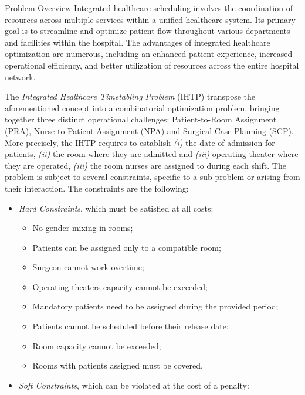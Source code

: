 \begin{section}{Problem Overview}
 Integrated healthcare scheduling involves the coordination of resources
 across multiple services within a unified healthcare system. Its primary
 goal is to streamline and optimize patient flow throughout various departments
 and facilities within the hospital. The advantages of integrated healthcare
 optimization are numerous, including an enhanced patient experience, increased
 operational efficiency, and better utilization of resources across the entire
 hospital network.

 The \textit{Integrated Healthcare Timetabling Problem} (IHTP) \cite{ihtc2024} transpose the
 aforementioned concept into a combinatorial optimization problem, bringing together
 three distinct operational challenges:
 Patient-to-Room Assignment (PRA), Nurse-to-Patient Assignment (NPA) and
 Surgical Case Planning (SCP).
 More precisely, the IHTP requires to establish \textit{(i)} the date of admission for patients,
 \textit{(ii)} the room where they are admitted and \textit{(iii)} operating theater where they are operated,
 \textit{(iii)} the room nurses are assigned to during each shift.
 The problem is subject to several constraints, specific to a sub-problem or arising from their interaction.
 The constraints are the following:
 \begin{itemize}
     \item \textit{Hard Constraints}, which must be satisfied at all costs:
           \begin{itemize}
               \item No gender mixing in rooms;
               \item Patients can be assigned only to a compatible room;
               \item Surgeon cannot work overtime;
               \item Operating theaters capacity cannot be exceeded;
               \item Mandatory patients need to be assigned during the provided period;
               \item Patients cannot be scheduled before their release date;
               \item Room capacity cannot be exceeded;
               \item Rooms with patients assigned must be covered.
           \end{itemize}
     \item \textit{Soft Constraints}, which can be violated at the cost of a penalty:

\end{itemize}
\end{section}
